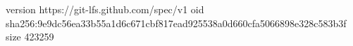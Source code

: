 version https://git-lfs.github.com/spec/v1
oid sha256:9e9dc56ea33b55a1d6c671cbf817ead925538a0d660cfa5066898e328c583b3f
size 423259
